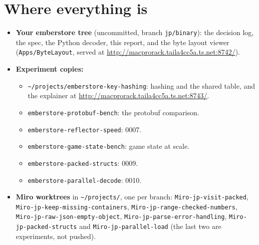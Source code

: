 \documentclass[11pt,a4paper]{article}
\newcommand{\code}[1]{\texttt{#1}}
\begin{document}
\section{Where everything is}\label{sec:where}
{\sloppy
\begin{itemize}
  \item \textbf{Your emberstore tree} (uncommitted, branch \code{jp/binary}): the decision log, the spec, the Python decoder, this report, and the byte layout viewer (\code{Apps/ByteLayout}, served at \url{http://macprorack.taila4cc5a.ts.net:8742/}).
  \item \textbf{Experiment copies:}
    \begin{itemize}
      \item \code{\textasciitilde/projects/emberstore-key-hashing}: hashing and the shared table, and the explainer at \url{http://macprorack.taila4cc5a.ts.net:8743/}.
      \item \code{emberstore-protobuf-bench}: the protobuf comparison.
      \item \code{emberstore-reflector-speed}: 0007.
      \item \code{emberstore-game-state-bench}: game state at scale.
      \item \code{emberstore-packed-structs}: 0009.
      \item \code{emberstore-parallel-decode}: 0010.
    \end{itemize}
  \item \textbf{Miro worktrees} in \code{\textasciitilde/projects/}, one per branch: \code{Miro-jp-visit-packed}, \code{Miro-jp-keep-missing-containers}, \code{Miro-jp-range-checked-numbers}, \code{Miro-jp-raw-json-empty-object}, \code{Miro-jp-parse-error-handling}, \code{Miro-jp-packed-structs} and \code{Miro-jp-parallel-load} (the last two are experiments, not pushed).
\end{itemize}
}
\end{document}

